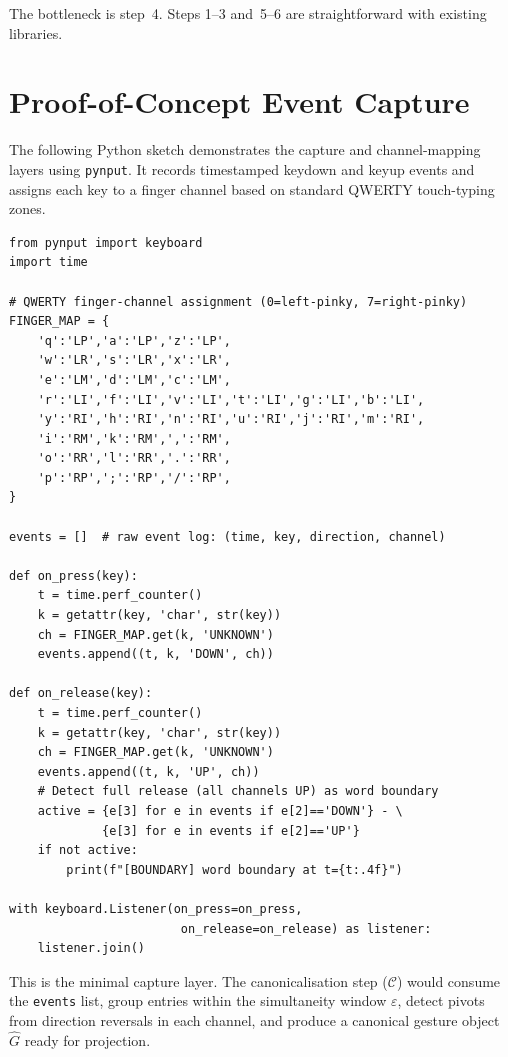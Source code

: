 \documentclass[11pt, a4paper]{article}
\begin{document}
The bottleneck is step~4. Steps 1--3 and~5--6 are straightforward with
existing libraries.

\section{Proof-of-Concept Event Capture}

The following Python sketch demonstrates the capture and channel-mapping
layers using \texttt{pynput}. It records timestamped keydown and keyup
events and assigns each key to a finger channel based on standard QWERTY
touch-typing zones.

\begin{lstlisting}[style=pycode, caption={Gesture capture skeleton (\texttt{pynput})}]
from pynput import keyboard
import time

# QWERTY finger-channel assignment (0=left-pinky, 7=right-pinky)
FINGER_MAP = {
    'q':'LP','a':'LP','z':'LP',
    'w':'LR','s':'LR','x':'LR',
    'e':'LM','d':'LM','c':'LM',
    'r':'LI','f':'LI','v':'LI','t':'LI','g':'LI','b':'LI',
    'y':'RI','h':'RI','n':'RI','u':'RI','j':'RI','m':'RI',
    'i':'RM','k':'RM',',':'RM',
    'o':'RR','l':'RR','.':'RR',
    'p':'RP',';':'RP','/':'RP',
}

events = []  # raw event log: (time, key, direction, channel)

def on_press(key):
    t = time.perf_counter()
    k = getattr(key, 'char', str(key))
    ch = FINGER_MAP.get(k, 'UNKNOWN')
    events.append((t, k, 'DOWN', ch))

def on_release(key):
    t = time.perf_counter()
    k = getattr(key, 'char', str(key))
    ch = FINGER_MAP.get(k, 'UNKNOWN')
    events.append((t, k, 'UP', ch))
    # Detect full release (all channels UP) as word boundary
    active = {e[3] for e in events if e[2]=='DOWN'} - \
             {e[3] for e in events if e[2]=='UP'}
    if not active:
        print(f"[BOUNDARY] word boundary at t={t:.4f}")

with keyboard.Listener(on_press=on_press,
                        on_release=on_release) as listener:
    listener.join()
\end{lstlisting}

This is the minimal capture layer. The canonicalisation step
($\mathcal{C}$) would consume the \texttt{events} list, group entries
within the simultaneity window $\varepsilon$, detect pivots from
direction reversals in each channel, and produce a canonical gesture
object $\hat{G}$ ready for projection.
\end{document}
